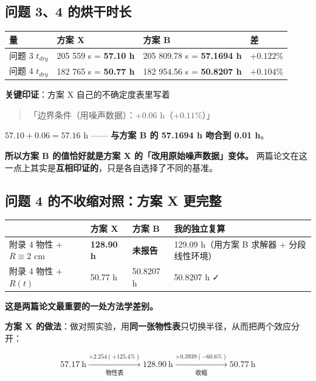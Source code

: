 \subsection{问题 3、4 的烘干时长}


\begin{center}
\small
\begin{tabular}{llll}
\toprule
量 & 方案 X & 方案 B & 差 \\
\midrule
问题 3 $t_{dry}$ & 205 559 s = \textbf{57.10 h} & 205 809.78 s = \textbf{57.1694 h} & $+0.122\%$ \\
问题 4 $t_{dry}$ & 182 765 s = \textbf{50.77 h} & 182 954.56 s = \textbf{50.8207 h} & $+0.104\%$ \\
\bottomrule
\end{tabular}
\end{center}


\textbf{关键印证}：方案 X 自己的不确定度表里写着


\begin{quote}
「边界条件（用噪声数据）：$+0.06$ h（$+0.11\%$）」
\end{quote}


$57.10+0.06=57.16$ h —— \textbf{与方案 B 的 57.1694 h 吻合到 0.01 h}。


\textbf{所以方案 B 的值恰好就是方案 X 的「改用原始噪声数据」变体。} 两篇论文在这一点上其实是\textbf{互相印证的}，只是各自选择了不同的基准。


\subsection{问题 4 的不收缩对照：方案 X 更完整}


\begin{center}
\small
\begin{tabular}{llll}
\toprule
 & 方案 X & 方案 B & 我的独立复算 \\
\midrule
附录 4 物性 + $R\equiv2$ cm & \textbf{128.90 h} & \textbf{未报告} & 129.09 h（用方案 B 求解器 + 分段线性环境） \\
附录 4 物性 + $R(t)$ & 50.77 h & 50.8207 h & 50.8207 h ✓ \\
\bottomrule
\end{tabular}
\end{center}


\textbf{这是两篇论文最重要的一处方法学差别。}


\textbf{方案 X 的做法}：做对照实验，用\textbf{同一张物性表}只切换半径，从而把两个效应分开：


\begin{equation*}
57.17\ \text{h}\xrightarrow[\text{物性表}]{\times2.254(+125.4\%)}128.90\ \text{h}\xrightarrow[\text{收缩}]{\times0.3939(\mathbf{-60.6\%})}50.77\ \text{h}
\end{equation*}


